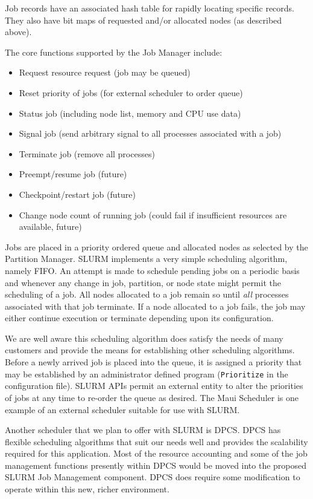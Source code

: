 Job records have an associated hash table for rapidly locating 
specific records. They also have bit maps of requested and/or 
allocated nodes (as described above).

The core functions supported by the Job Manager include:
\begin{itemize}
\item Request resource request (job may be queued)
\item Reset priority of jobs (for external scheduler to order queue)
\item Status job (including node list, memory and CPU use data)
\item Signal job (send arbitrary signal to all processes associated with a job)
\item Terminate job (remove all processes)
\item Preempt/resume job  (future)
\item Checkpoint/restart job (future)
\item Change node count of running job (could fail if insufficient resources are 
available, future)
\end{itemize}

Jobs are placed in a priority ordered queue and allocated nodes as 
selected by the Partition Manager. 
SLURM implements a very simple scheduling algorithm, namely FIFO. 
An attempt is made to schedule pending jobs on a periodic basis
and whenever any change in job, partition, or node state might permit
the scheduling of a job.  All nodes allocated to a job remain so
until {\em all} processes associated with that job terminate.  If a
node allocated to a job fails, the job may either continue execution or
terminate depending upon its configuration.

We are well aware this scheduling algorithm does satisfy the needs of many
customers and provide the means for establishing other scheduling
algorithms. Before a newly arrived job is placed into the queue, it
is assigned a priority that may be established by an administrator
defined program ({\tt Prioritize} in the configuration file). 
SLURM APIs permit an external entity to alter the
priorities of jobs at any time to re-order the queue as desired.
The Maui Scheduler\cite{Jackson2001,Maui2002}
is one example of an external scheduler suitable for use with SLURM.

Another scheduler that we plan to offer with SLURM is
DPCS\cite{DPCS2002}.  DPCS
has flexible scheduling algorithms that suit our needs well and provides
the scalability required for this application. Most of the resource
accounting and some of the job management functions presently within
DPCS would be moved into the proposed SLURM Job Management component.
DPCS does require some modification to operate within this new, richer
environment.

